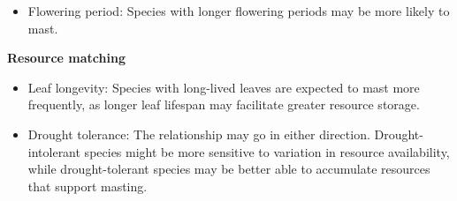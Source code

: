 \documentclass{article}
\begin{document}
\begin{itemize}
\item{Flowering period: Species with longer flowering periods may be more likely to mast.}
\end{itemize}

\textbf{Resource matching}\\
\begin{itemize}
\item{Leaf longevity: Species with long-lived leaves are expected to mast more frequently, as longer leaf lifespan may facilitate greater resource storage.}
\end{itemize}

\begin{itemize}
\item{Drought tolerance: The relationship may go in either direction. Drought-intolerant species might be more sensitive to variation in resource availability, while drought-tolerant species may be better able to accumulate resources that support masting.}
\end{itemize}
\end{document}
